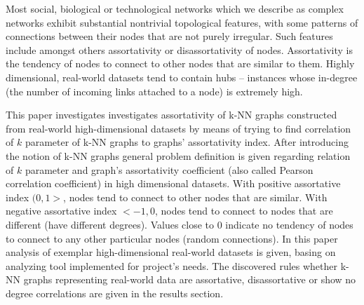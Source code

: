 Most social, biological or technological networks which we describe as complex networks exhibit substantial nontrivial topological features, with some patterns of connections between their nodes that are not purely irregular.
Such features include amongst others assortativity or disassortativity of nodes.
Assortativity is the tendency of nodes to connect to other nodes that are similar to them.
Highly dimensional, real-world datasets tend to contain hubs – instances whose in-degree (the number of incoming links attached to a node) is extremely high.

This paper investigates investigates assortativity of k-NN graphs constructed from real-world high-dimensional datasets by means of trying to find correlation of $k$ parameter of k-NN graphs to graphs' assortativity index.
After introducing the notion of k-NN graphs general problem definition is given regarding relation of $k$ parameter and graph's assortativity coefficient (also called Pearson correlation coefficient) in high dimensional datasets.
With positive assortative index $(0, 1>$, nodes tend to connect to other nodes that are similar.
With negative assortative index $<-1, 0$, nodes tend to connect to nodes that are different (have different degrees).
Values close to $0$ indicate no tendency of nodes to connect to any other particular nodes (random connections).
In this paper analysis of exemplar high-dimensional real-world datasets is given, basing on analyzing tool implemented for project's needs.
The discovered rules whether k-NN graphs representing real-world data are assortative, disassortative or show no degree correlations are given in the results section.